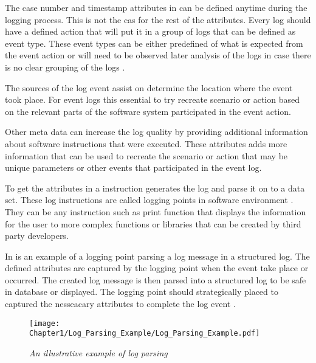 The case number and timestamp attributes in  can be defined anytime during the logging process. This is not the cas for the rest of the attributes. Every log should have a defined action that will put it in a group of logs that can be defined as event type. These event types can be either predefined of what is expected from the event action or will need to be observed later analysis of the logs in case there is no clear grouping of the logs \cite{Bekeneva2020, Fedaghi2010}.\par The sources of the log event assist on determine the location where the event took place. For event logs this essential to try recreate scenario or action based on the relevant parts of the software system participated in the event action.\par Other meta data can increase the log quality by providing additional information about software instructions that were executed. These attributes adds more information that can be used to recreate the scenario or action that may be unique parameters or other events that participated in the event log.\par To get the attributes in  a instruction generates the log and parse it on to a data set. These log instructions are called logging points in software environment \cite{Pecchia2015, Zhu2015}. They can be any instruction such as print function that displays the information for the user to more complex functions or libraries that can be created by third party developers.

\clearpage

In  is an example of a logging point parsing a log message in a structured log. The defined attributes are captured by the logging point when the event take place or occurred. The created log message is then parsed into a structured log to be safe in database or displayed. The logging point should strategically placed to captured the nesseacary attributes to complete the log event \cite{Fedaghi2010}.

\begin{figure}[!htb] %
	\centering %
	\texttt{[image: Chapter1/Log\_Parsing\_Example/Log\_Parsing\_Example.pdf]}
	\caption[An illustrative example of log parsing]
	{\textit{An illustrative example of log parsing \cite{Zhu2019}}} \label{fig:Log_Parsing}
\end{figure}

